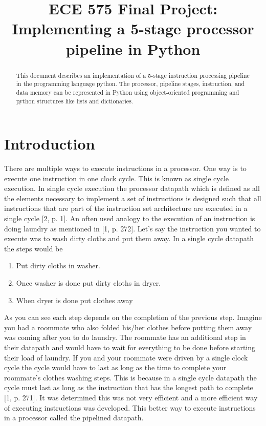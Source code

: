 \documentclass[conference]{IEEEtran}
\begin{document}
\title{ECE 575 Final Project: Implementing a 5-stage processor pipeline in Python}

\author{
}

\maketitle

\begin{abstract}
This document describes an implementation of a 5-stage instruction processing pipeline in the programming language python.  The processor, pipeline stages, instruction, and data memory can be represented in Python using object-oriented programming and python structures like lists and dictionaries.
\end{abstract}

\section{Introduction}
There are multiple ways to execute instructions in a processor.  One way is to execute one instruction in one clock cycle.  This is known as single cycle execution.  In single cycle execution the processor datapath which is defined as all the elements necessary to implement a set of instructions is designed such that all instructions that are part of the instruction set architecture are executed in a single cycle [2, p. 1].  An often used analogy to the execution of an instruction is doing laundry as mentioned in [1, p. 272].  Let's say the instruction you wanted to execute was to wash dirty cloths and put them away.  In a single cycle datapath the steps would be
\begin{enumerate}
    \item Put dirty cloths in washer.
    \item Once washer is done put dirty cloths in dryer.
    \item When dryer is done put clothes away
\end{enumerate}
As you can see each step depends on the completion of the previous step.  Imagine you had a roommate who also folded his/her clothes before putting them away was coming after you to do laundry.  The roommate has an additional step in their datapath and would have to wait for everything to be done before starting their load of laundry.  If you and your roommate were driven by a single clock cycle the cycle would have to last as long as the time to complete your roommate's clothes washing steps.  This is because in a single cycle datapath the cycle must last as long as the instruction that has the longest path to complete [1, p. 271].  It was determined this was not very efficient and a more efficient way of executing instructions was developed.  This better way to execute instructions in a processor called the pipelined datapath.
\end{document}
